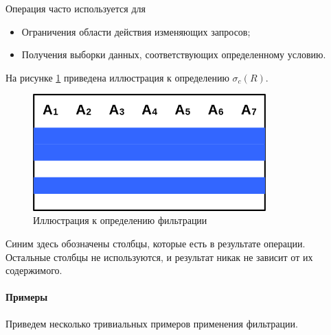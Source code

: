 Операция часто используется для
\begin{itemize}
	\item Ограничения области действия изменяющих запросов;
	\item Получения выборки данных, соответствующих определенному условию.
\end{itemize}

На рисунке \ref{sel-def} приведена иллюстрация к определению $\sigma_c(R)$.

\begin{figure}[H]
	\centering
	\includegraphics[width=0.8\textwidth]{../assets/kgeorgiy/relalgebra/Primitive_Section_0.svg.png}
	\caption{Иллюстрация к определению фильтрации}
	\label{sel-def}
\end{figure}

Синим здесь обозначены столбцы, которые есть в результате операции. Остальные столбцы не
используются, и результат никак не зависит от их содержимого.

\paragraph{Примеры}
Приведем несколько тривиальных примеров применения фильтрации.


